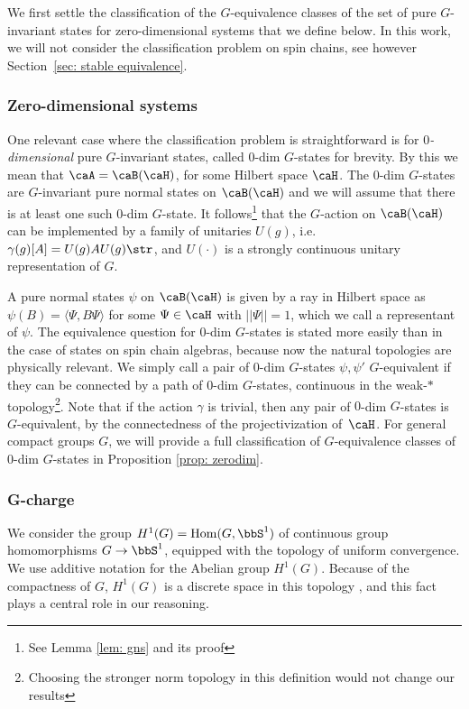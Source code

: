 We first settle the classification of the $G$-equivalence classes of the set of pure $G$-invariant states for zero-dimensional systems that we define below. In this work, we will not consider the classification problem on spin chains, see however Section~\ref{sec: stable equivalence}.

\subsubsection{Zero-dimensional systems}\label{sec: equivalence zero}
One relevant case where the classification problem is straightforward is for \emph{$0$-dimensional} pure $G$-invariant states, called $0$-dim $G$-states for brevity. 
By this we mean that $\caA = \caB(\caH)$, for some Hilbert space $\caH$. The $0$-dim $G$-states are $G$-invariant pure normal states on $\caB(\caH)$ and we will assume that there is at least one such $0$-dim $G$-state. 
It follows\footnote{See Lemma \ref{lem: gns} and its proof} that the $G$-action on $\caB(\caH)$ can be implemented by a family of unitaries $U(g)$, i.e.\  $ \gamma(g)[A] = U(g) A U(g)\str$, and $U(\cdot)$ is a strongly continuous unitary representation of $G$.

A pure normal states $\psi$ on $\caB(\caH)$ is given by a ray in Hilbert space as  $\psi(B)=\langle\Psi, B\Psi\rangle$ for some $\Psi \in \caH$ with $||\Psi||=1$, which we call a representant of $\psi$.
The equivalence question for $0$-dim $G$-states is stated more easily than in the case of states on spin chain algebras, because now the natural topologies are physically relevant. 
We simply call a pair of $0$-dim $G$-states $\psi,\psi'$  $G$-equivalent if they can be connected by a  path of $0$-dim $G$-states, continuous in the weak-$*$ topology\footnote{Choosing the stronger norm topology in this definition would not change our results}.  
Note that if the action $\gamma$ is trivial, then any pair of $0$-dim $G$-states is $G$-equivalent, by the connectedness of the projectivization of~$\caH$. For general compact groups $G$, we will provide a full classification of $G$-equivalence classes of $0$-dim $G$-states  in Proposition \ref{prop: zerodim}.

\subsubsection{G-charge}\label{sec: g charge}

We consider the group $H^1(G)=\mathrm{Hom}(G,\bbS^1)$ of continuous group homomorphisms $G\to \bbS^1$, equipped with the topology of uniform convergence. We use additive notation for the Abelian group $H^1(G)$. Because of the compactness of $G$,  $H^1(G)$ is a discrete space in this topology \cite{hofmann1965topologische}, and this fact plays a central role in our reasoning. 


